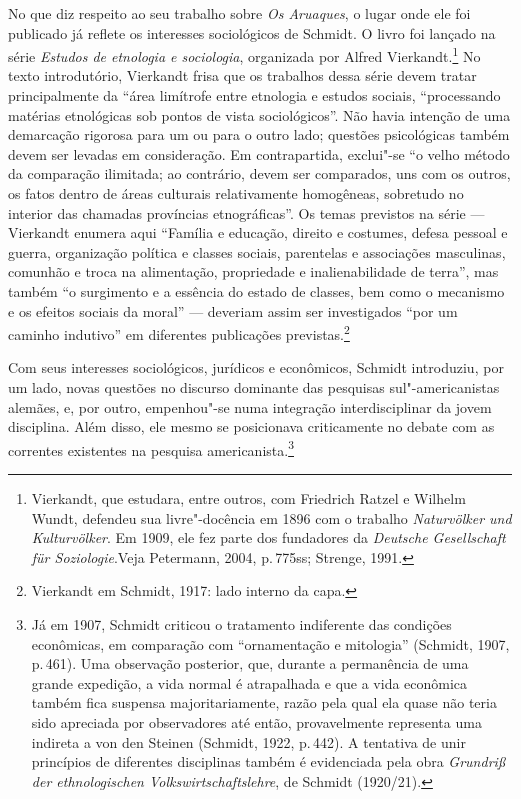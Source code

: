 No que diz respeito ao seu trabalho sobre \textit{Os Aruaques}, o lugar onde
ele foi publicado já reflete os interesses sociológicos de Schmidt. O
livro foi lançado na série \textit{Estudos de etnologia e sociologia}, organizada por
Alfred Vierkandt.\footnote{Vierkandt, que estudara, entre
  outros, com Friedrich Ratzel e Wilhelm Wundt, defendeu sua
  livre"-docência em 1896 com o trabalho \textit{Naturvölker und
  Kulturvölker}. Em 1909, ele
  fez parte dos fundadores da \textit{Deutsche Gesellschaft für
  Soziologie}.Veja Petermann, 2004, p.\,775ss; Strenge, 1991.} No texto introdutório, Vierkandt frisa que os
trabalhos dessa série devem tratar principalmente da ``área limítrofe
entre etnologia e estudos sociais,
``processando matérias etnológicas sob pontos de vista sociológicos''.
Não havia intenção de uma demarcação rigorosa para um ou para o outro
lado; questões psicológicas também devem ser levadas em consideração. Em
contrapartida, exclui"-se ``o velho método da comparação ilimitada; ao
contrário, devem ser comparados, uns com os outros, os fatos dentro de
áreas culturais relativamente homogêneas, sobretudo no interior das
chamadas províncias etnográficas''. Os temas previstos na série ---
Vierkandt enumera aqui ``Família e educação, direito e costumes, defesa
pessoal e guerra, organização política e classes sociais, parentelas e associações masculinas, comunhão e troca na
alimentação, propriedade e inalienabilidade de terra'', mas também ``o surgimento e a essência do estado de classes, bem como o mecanismo e os efeitos sociais da moral''
--- deveriam assim ser investigados ``por um caminho indutivo'' em
diferentes publicações previstas.\footnote{Vierkandt em Schmidt, 1917:
  lado interno da capa.}


Com seus interesses sociológicos, jurídicos e econômicos, Schmidt
introduziu, por um lado, novas questões no discurso dominante das
pesquisas sul"-americanistas alemães, e, por outro, empenhou"-se numa
integração interdisciplinar da jovem disciplina. Além disso, ele mesmo
se posicionava criticamente no debate com as correntes existentes na
pesquisa americanista.\footnote{Já em 1907, Schmidt criticou o
  tratamento indiferente das condições econômicas, em comparação com
  ``ornamentação e mitologia'' (Schmidt, 1907, p.\,461). Uma observação
  posterior, que, durante a permanência de uma grande expedição, a vida
  normal é atrapalhada e que a vida econômica também fica suspensa
  majoritariamente, razão pela qual ela quase não teria sido apreciada
  por observadores até então, provavelmente representa uma indireta a
  von den Steinen (Schmidt, 1922, p.\,442). A tentativa de unir
  princípios de diferentes disciplinas também é evidenciada pela obra
  \textit{Grundriß der ethnologischen Volkswirtschaftslehre}, de Schmidt (1920/21).}

